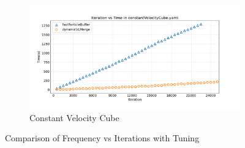 \begin{figure}[htbp]
    \begin{subfigure}[b]{\textwidth}
        \centering
        \includegraphics[width=0.85\linewidth]{graphs/constantVelocityCube/freqvstimeiter.png}
        \vspace{-0.5em}
        \caption{\scriptsize Constant Velocity Cube}
        \label{fig:tuningconstantVelocityCubeIter}
    \end{subfigure}

    \vspace{0.5em}
    \caption{Comparison of Frequency vs Iterations with Tuning}
    \label{fig:mainIterWithTuning}
\end{figure}



